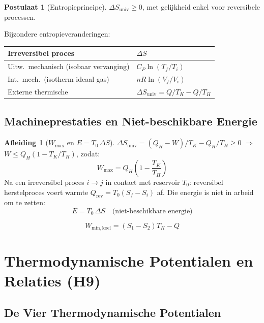\documentclass[a4paper,twoside,10pt]{article}
\theoremstyle{definition}
\newtheorem{postulate}{Postulaat}[section]
\newtheorem{derivation}{Afleiding}[section]
\begin{document}
\begin{postulate}[Entropieprincipe]
$\Delta S_{\mathrm{univ}} \geq 0$, met gelijkheid enkel voor reversibele processen.
\end{postulate}

Bijzondere entropieveranderingen:
\begin{center}
\renewcommand{\arraystretch}{1.2}
\begin{tabular}{@{}ll@{}}
\toprule
Irreversibel proces & $\Delta S$ \\
\midrule
Uitw.\ mechanisch (isobaar vervanging)   & $C_P\ln(T_f/T_i)$ \\
Int.\ mech.\ (isotherm ideaal gas)       & $nR\ln(V_f/V_i)$ \\
Externe thermische                        & $\Delta S_{\mathrm{univ}} = Q/T_K - Q/T_H$ \\
\bottomrule
\end{tabular}
\end{center}

\subsection{Machineprestaties en Niet-beschikbare Energie}

\begin{derivation}[$W_{\max}$ en $E = T_0\,\Delta S$]
$\Delta S_{\mathrm{univ}} = (Q_H-W)/T_K - Q_H/T_H \geq 0$
$\Rightarrow$ $W \leq Q_H(1 - T_K/T_H)$, zodat:
\[
  W_{\max} = Q_H\!\left(1 - \frac{T_K}{T_H}\right)
\]
Na een irreversibel proces $i\to j$ in contact met reservoir $T_0$:
reversibel herstelproces voert warmte $Q_{\mathrm{rev}} = T_0(S_f-S_i)$ af.
Die energie is niet in arbeid om te zetten:
\[
  \boxed{E = T_0\,\Delta S} \quad\text{(niet-beschikbare energie)}
\]
\end{derivation}

\[
  W_{\mathrm{min,koel}} = (S_1-S_2)T_K - Q
\]

\section{Thermodynamische Potentialen en Relaties (H9)}

\subsection{De Vier Thermodynamische Potentialen}
\end{document}
